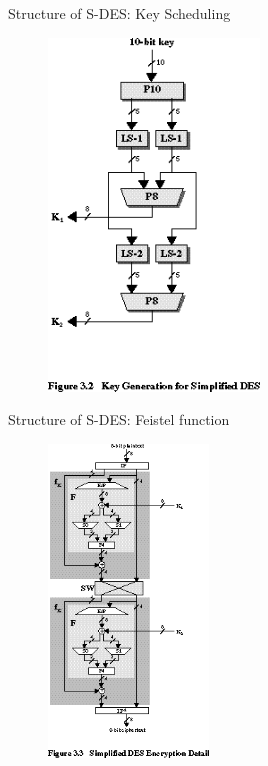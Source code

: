 \documentclass{beamer}
\begin{document}
    \begin{frame}{Structure of S-DES: Key Scheduling}
        \begin{figure}[h]
            \centering
            \includegraphics[width=0.5\textwidth]{./Images/keygen.png}
        \end{figure}
    \end{frame}

    \begin{frame}{Structure of S-DES: Feistel function}
        \begin{figure}[h]
            \centering
            \includegraphics[width=0.38\textwidth]{./Images/feistel.png}
        \end{figure}
    \end{frame}
\end{document}
